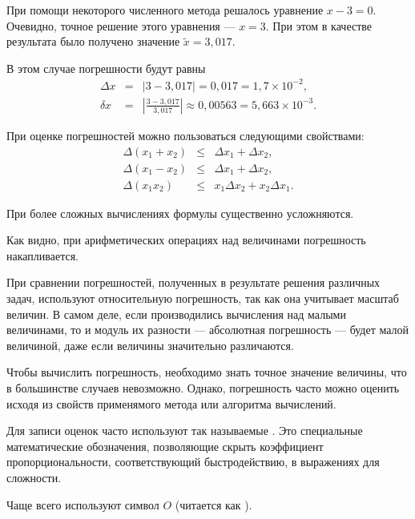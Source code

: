 \begin{example}
  При помощи некоторого численного метода решалось уравнение $x-3=0$.
  Очевидно, точное решение этого уравнения — $x=3$. При этом в
  качестве результата было получено значение $\tilde{x}=3{,}017$.

  В этом случае погрешности будут равны
  \begin{eqnarray*}
    \Delta x & = & \left|3 - 3{,}017\right| = 0{,}017 = 1{,}7\times10^{-2},\\
    \delta x & = & \left|\frac{3-3{,}017}{3{,}017}\right| \approx
      0{,}00563 = 5{,}663\times10^{-3}.
  \end{eqnarray*}
\end{example}


При оценке погрешностей можно пользоваться следующими свойствами:
\begin{eqnarray*}
  \Delta(x_1 + x_2) & \leqslant & \Delta x_1 + \Delta x_2,\\
  \Delta(x_1 - x_2) & \leqslant & \Delta x_1 + \Delta x_2,\\
  \Delta(x_1 x_2)   & \leqslant & x_1 \Delta x_2 + x_2 \Delta x_1.
\end{eqnarray*}

При более сложных вычислениях формулы существенно усложняются.

Как видно, при арифметических операциях над величинами погрешность
накапливается.

При сравнении погрешностей, полученных в результате решения различных
задач, используют относительную погрешность, так как она учитывает
масштаб величин. В самом деле, если производились вычисления над
малыми величинами, то и модуль их разности — абсолютная погрешность —
будет малой величиной, даже если величины значительно различаются.


Чтобы вычислить погрешность, необходимо знать точное значение
величины, что в большинстве случаев невозможно. Однако, погрешность
часто можно оценить исходя из свойств применямого метода или алгоритма
вычислений.

Для записи оценок часто используют так называемые . Это специальные математические обозначения,
позволяющие скрыть коэффициент пропорциональности, соответствующий
быстродействию, в выражениях для сложности.

Чаще всего используют символ $O$ (читается как ).

